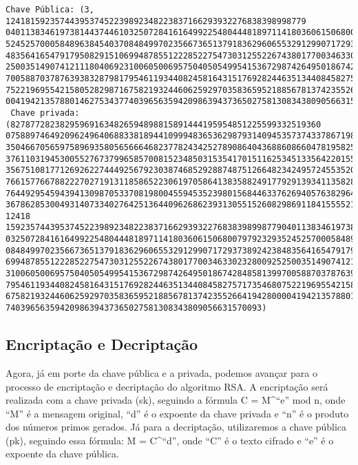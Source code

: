 \documentclass[11pt]{article}
\begin{document}
    \begin{Verbatim}[commandchars=\\\{\}]
Chave Pública: (3, 1241815923574439537452239892348223837166293932276838398998779
04011383461973814437446103250728416164992254804448189711418036061506800797923293
52452570005848963845403708484997023566736513791836296065532912990717293738924238
48356416547917950829151069948785512228522754730312552267438017700346330232800925
25003514907412111804069231006050069575040505499541536729874264950186742848581399
70058870378763938328798179546119344082458164315176928244635134408458275717354680
75221969554215805282987167582193244606259297035836595218856781374235526641942800
0041942135788014627534377403965635942098639437365027581308343809056631570093).
 Chave privada: (827877282382959691634826594898815891444195954851225599332519360
07588974649209624964068833818944109994836536298793140945357374337867198615529016
35046670565975896935805656664682377824342527890864043688608660478195825949492322
37611031945300552767379965857008152348503153541701511625345133564220155200616833
35675108177126926227444925679230387468529288748751266482342495724553520027197307
76615776678822270271913118586522306197058641383588249177929139341135828533011128
76449295459439413098705337081980045594535239801568446337626940576382964614358593
3678628530049314073340276425136440962686239313055152608298691184155552107, 12418
15923574439537452239892348223837166293932276838398998779040113834619738144374461
03250728416164992254804448189711418036061506800797923293524525700058489638454037
08484997023566736513791836296065532912990717293738924238483564165479179508291510
69948785512228522754730312552267438017700346330232800925250035149074121118040692
31006050069575040505499541536729874264950186742848581399700588703787639383287981
79546119344082458164315176928244635134408458275717354680752219695542158052829871
67582193244606259297035836595218856781374235526641942800004194213578801462753437
7403965635942098639437365027581308343809056631570093)
    \end{Verbatim}

    \hypertarget{encriptauxe7uxe3o-e-decriptauxe7uxe3o}{%
\subsection{Encriptação e
Decriptação}\label{encriptauxe7uxe3o-e-decriptauxe7uxe3o}}

Agora, já em porte da chave pública e a privada, podemos avançar para o
processo de encriptação e decriptação do algoritmo RSA. A encriptação
será realizada com a chave privada (sk), seguindo a fórmula C =
M\^{}``e'' mod n, onde ``M'' é a mensagem original, ``d'' é o expoente
da chave privada e ``n'' é o produto dos números primos gerados. Já para
a decriptação, utilizaremos a chave pública (pk), seguindo essa fórmula:
M = C\^{}``d'', onde ``C'' é o texto cifrado e ``e'' é o expoente da
chave pública.
\end{document}
